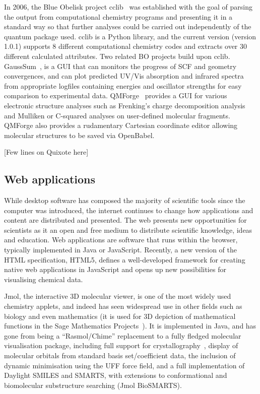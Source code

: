 \documentclass[10pt]{bmc_article}
\newenvironment{bmcformat}{\fussy\setboolean{publ}{true}}{\fussy}
\begin{document}
\begin{bmcformat}
In 2006, the Blue Obelisk project cclib~\cite{cclib} was established
with the goal of parsing the output from computational chemistry
programs and presenting it in a standard way so that further analyses
could be carried out independently of the quantum package used.
cclib is a Python library, and the current version (version 1.0.1)
supports 8 different computational chemistry codes and extracts over
30 different calculated attributes. Two related BO projects build upon 
cclib. GaussSum~\cite{WebGaussSum},
is a GUI that can monitors the progress of SCF and geometry convergences, 
and can plot predicted UV/Vis absorption and infrared spectra from 
appropriate logfiles containing energies and oscillator strengths for easy 
comparison to experimental data. QMForge~\cite{WebQMForge} provides 
a GUI for various electronic structure analyses such as Frenking's charge 
decomposition analysis~\cite{Frenking} and Mulliken or C-squared analyses
on user-defined molecular fragments. QMForge also provides a rudamentary
Cartesian coordinate editor allowing molecular structures to be saved via OpenBabel.

[Few lines on Quixote here]

\subsection*{Web applications}

While desktop software has composed the majority of scientific tools
since the computer was introduced, the internet continues to change
how applications and content are distributed and presented. The web
presents new opportunities for scientists as it
an open and free medium to distribute scientific knowledge, ideas and
education. Web applications are software that runs within the browser,
typically implemented in Java or JavaScript.
Recently, a new version of the HTML
specification, HTML5, defines a well-developed framework
for creating native web applications in JavaScript and opens up
new possibilities for visualising chemical data.

Jmol, the interactive 3D molecular viewer, is one of the most widely used
chemistry applets, and indeed has
seen widespread use in other fields such as biology and 
even mathematics (it is used for 3D depiction of mathematical
functions in the Sage Mathematics Projects~\cite{WebSage}). It is implemented
in Java, and has gone from being a ``Rasmol/Chime'' replacement to a fully fledged molecular
visualisation package, including full support for crystallography~\cite{Hanson2010},
display of molecular orbitals from standard basis set/coefficient data,
the inclusion of dynamic minimisation using the UFF force field, and
a full implementation of Daylight SMILES and SMARTS, with extensions to
conformational and biomolecular substructure searching (Jmol
BioSMARTS).


\end{bmcformat}
\end{document}
